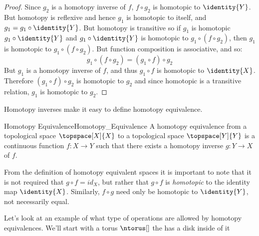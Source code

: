 \documentclass[oneside]{book}                                                  %
\begin{document}
                \begin{proof}
                    Since $g_{2}$ is a homotopy inverse of $f$,
                    $f\circ{g}_{2}$ is homotopic to $\identity{Y}$. But homotopy
                    is reflexive and hence $g_{1}$ is homotopic to itself, and
                    $g_{1}=g_{1}\circ\identity{Y}$. But homotopy is transitive
                    so if $g_{1}$ is homotopic $g_{1}\circ\identity{Y}$ and
                    $g_{1}\circ\identity{Y}$ is homotopic to
                    $g_{1}\circ(f\circ{g}_{2})$, then $g_{1}$ is homotopic to
                    $g_{1}\circ(f\circ{g}_{2})$. But function composition is
                    associative, and so:
                    \begin{equation}
                        g_{1}\circ(f\circ{g}_{2})=(g_{1}\circ{f})\circ{g}_{2}
                    \end{equation}
                    But $g_{1}$ is a homotopy inverse of $f$, and thus
                    $g_{1}\circ{f}$ is homotopic to $\identity{X}$. Therefore
                    $(g_{1}\circ{f})\circ{g}_{2}$ is homotopic to ${g}_{2}$ and
                    since homotopic is a transitive relation, $g_{1}$ is
                    homotopic to ${g}_{2}$.
                \end{proof}
                Homotopy inverses make it easy to define homotopy equivalence.
                \begin{fdefinition}{Homotopy Equivalence}{Homotopy_Equivalence}
                    A homotopy equivalence from a topological space
                    $\topspace[X]{X}$ to a topological space $\topspace[Y]{Y}$
                    is a continuous function $f:X\rightarrow{Y}$ such that there
                    exists a homotopy inverse $g:Y\rightarrow{X}$ of $f$.
                \end{fdefinition}
                From the definition of homotopy equivalent spaces it is
                important to note that it is not required that
                $g\circ{f}=id_{X}$, but rather that $g\circ{f}$ is
                \textit{homotopic} to the identity map $\identity{X}$.
                Similarly, $f\circ{g}$ need only be homotopic to $\identity{Y}$,
                not necessarily equal.
                \par\hfill\par
                Let's look at an example of what type of operations are allowed
                by homotopy equivalences. We'll start with a torus $\ntorus[]$
                the has a disk inside of it
\end{document}
